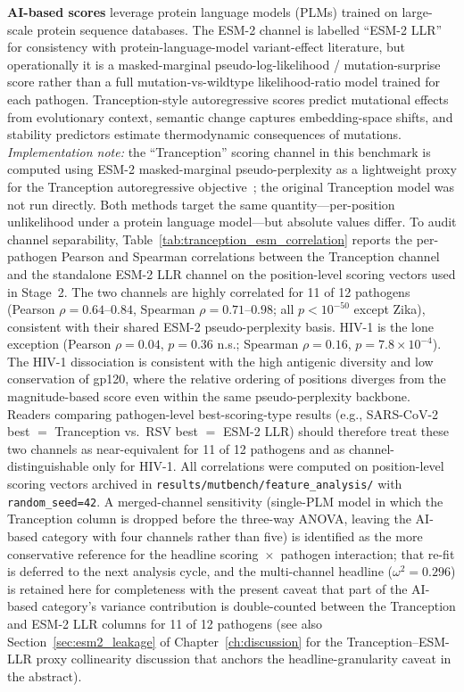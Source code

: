 \textbf{AI-based scores} leverage protein language models (PLMs) trained on large-scale protein sequence databases.
The ESM-2 channel is labelled ``ESM-2 LLR'' for consistency with protein-language-model variant-effect literature, but operationally it is a masked-marginal pseudo-log-likelihood / mutation-surprise score rather than a full mutation-vs-wildtype likelihood-ratio model trained for each pathogen. Tranception-style autoregressive scores predict mutational effects from evolutionary context, semantic change captures embedding-space shifts, and stability predictors estimate thermodynamic consequences of mutations.
\textit{Implementation note:} the ``Tranception'' scoring channel in this benchmark is computed using ESM-2 masked-marginal pseudo-perplexity as a lightweight proxy for the Tranception autoregressive objective~\cite{notin2022tranception}; the original Tranception model was not run directly. Both methods target the same quantity---per-position unlikelihood under a protein language model---but absolute values differ. To audit channel separability, Table~\ref{tab:tranception_esm_correlation} reports the per-pathogen Pearson and Spearman correlations between the Tranception channel and the standalone ESM-2 LLR channel on the position-level scoring vectors used in Stage~2. The two channels are highly correlated for 11 of 12 pathogens (Pearson $\rho = 0.64$--$0.84$, Spearman $\rho = 0.71$--$0.98$; all $p < 10^{-50}$ except Zika), consistent with their shared ESM-2 pseudo-perplexity basis. HIV-1 is the lone exception (Pearson $\rho = 0.04$, $p = 0.36$ n.s.; Spearman $\rho = 0.16$, $p = 7.8 \times 10^{-4}$). The HIV-1 dissociation is consistent with the high antigenic diversity and low conservation of gp120, where the relative ordering of positions diverges from the magnitude-based score even within the same pseudo-perplexity backbone. Readers comparing pathogen-level best-scoring-type results (e.g., SARS-CoV-2 best $=$ Tranception vs.\ RSV best $=$ ESM-2 LLR) should therefore treat these two channels as near-equivalent for 11 of 12 pathogens and as channel-distinguishable only for HIV-1.
All correlations were computed on position-level scoring vectors archived in \texttt{results/mutbench/feature\_analysis/} with \texttt{random\_seed=42}. A merged-channel sensitivity (single-PLM model in which the Tranception column is dropped before the three-way ANOVA, leaving the AI-based category with four channels rather than five) is identified as the more conservative reference for the headline scoring~$\times$~pathogen interaction; that re-fit is deferred to the next analysis cycle, and the multi-channel headline ($\omega^2 = 0.296$) is retained here for completeness with the present caveat that part of the AI-based category's variance contribution is double-counted between the Tranception and ESM-2 LLR columns for 11 of 12 pathogens (see also Section~\ref{sec:esm2_leakage} of Chapter~\ref{ch:discussion} for the Tranception--ESM-LLR proxy collinearity discussion that anchors the headline-granularity caveat in the abstract).

